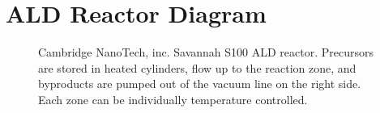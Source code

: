 \section{ALD Reactor Diagram}
\label{sup:ALD-design}

\begin{figure}[htb]
   \centering
	\hspace{1cm}
   \caption[Cambridge NanoTech, inc. S100 ALD System]%
   		{Cambridge NanoTech, inc. Savannah S100 ALD reactor. Precursors are stored in heated cylinders, flow up to the reaction zone, and byproducts are pumped out of the vacuum line on the right side. Each zone can be individually temperature controlled.}
   \label{fig:S100}
\end{figure}
